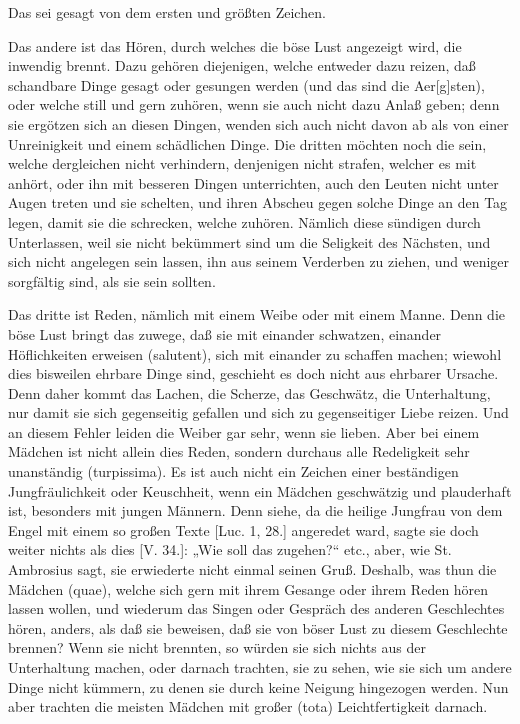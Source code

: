 Das sei gesagt von dem ersten und größten Zeichen.

Das andere ist das Hören, durch welches die böse Lust angezeigt wird, die inwendig brennt. Dazu gehören diejenigen, welche entweder dazu reizen, daß schandbare Dinge gesagt oder gesungen werden (und das sind die Aer[g]sten), oder welche still und gern zuhören, wenn sie auch nicht dazu Anlaß geben; denn sie ergötzen sich an diesen Dingen, wenden sich auch nicht davon ab als von einer Unreinigkeit und einem schädlichen Dinge. Die dritten möchten noch die sein, welche dergleichen nicht verhindern, denjenigen nicht strafen, welcher es mit anhört, oder ihn mit besseren Dingen unterrichten, auch den Leuten nicht unter Augen treten und sie schelten, und ihren Abscheu gegen solche Dinge an den Tag legen, damit sie die schrecken, welche zuhören. Nämlich diese sündigen durch Unterlassen, weil sie nicht bekümmert sind um die Seligkeit des Nächsten, und sich nicht angelegen sein lassen, ihn aus seinem Verderben zu ziehen, und weniger sorgfältig sind, als sie sein sollten.

Das dritte ist Reden, nämlich mit einem Weibe oder mit einem Manne. Denn die böse Lust bringt das zuwege, daß sie mit einander schwatzen, einander Höflichkeiten erweisen (salutent), sich mit einander zu schaffen machen; wiewohl dies bisweilen ehrbare Dinge sind, geschieht es doch nicht aus ehrbarer Ursache. Denn daher kommt das Lachen, die Scherze, das Geschwätz, die Unterhaltung, nur damit sie sich gegenseitig gefallen und sich zu gegenseitiger
Liebe reizen. Und an diesem Fehler leiden die Weiber gar sehr, wenn sie lieben. Aber bei einem Mädchen ist nicht allein dies Reden, sondern durchaus alle Redeligkeit sehr unanständig (turpissima). Es ist auch nicht ein Zeichen einer beständigen Jungfräulichkeit oder Keuschheit, wenn ein Mädchen geschwätzig und plauderhaft ist, besonders mit jungen Männern. Denn siehe, da die heilige Jungfrau von dem Engel mit einem so großen Texte [Luc. 1, 28.] angeredet ward, sagte sie doch weiter nichts als dies [V. 34.]: „Wie soll das zugehen?“ etc., aber, wie St. Ambrosius sagt, sie erwiederte nicht einmal seinen Gruß. Deshalb, was thun die Mädchen (quae), welche sich gern mit ihrem Gesange oder ihrem Reden hören lassen wollen, und wiederum das Singen oder Gespräch des anderen Geschlechtes hören, anders, als daß sie beweisen, daß sie von böser Lust zu diesem Geschlechte brennen? Wenn sie nicht brennten, so würden sie sich nichts aus der Unterhaltung machen, oder darnach trachten, sie zu sehen, wie sie sich um andere Dinge nicht kümmern, zu denen sie durch keine Neigung hingezogen werden. Nun aber trachten die meisten Mädchen mit großer (tota) Leichtfertigkeit darnach.

